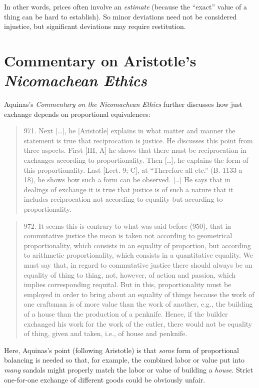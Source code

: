             In other words, prices often involve an \emph{estimate} (because the “exact” value of a thing can be hard to establish). So minor deviations need not be considered injustice, but significant deviations may require restitution.

\section{Commentary on Aristotle's \textit{Nicomachean Ethics}}

    Aquinas’s \textit{Commentary on the Nicomachean Ethics} further discusses how just exchange depends on proportional equivalences:
    
    \begin{quote}
        971. Next […], he [Aristotle] explains in what matter and manner the statement is true that reciprocation is justice. He discusses this point from three aspects. First [III, A] he shows that there must be reciprocation in exchanges according to proportionality. Then […], he explains the form of this proportionality. Last [Lect. 9; C], at “Therefore all etc.” (B. 1133 a 18), he shows how such a form can be observed. […] He says that in dealings of exchange it is true that justice is of such a nature that it includes reciprocation not according to equality but according to proportionality.
    \end{quote}
    
    \begin{quote}
        972. It seems this is contrary to what was said before (950), that in commutative justice the mean is taken not according to geometrical proportionality, which consists in an equality of proportion, but according to arithmetic proportionality, which consists in a quantitative equality. We must say that, in regard to commutative justice there should always be an equality of thing to thing, not, however, of action and passion, which implies corresponding requital. But in this, proportionality must be employed in order to bring about an equality of things because the work of one craftsman is of more value than the work of another, e.g., the building of a house than the production of a penknife. Hence, if the builder exchanged his work for the work of the cutler, there would not be equality of thing, given and taken, i.e., of house and penknife.
    \end{quote}

    Here, Aquinas’s point (following Aristotle) is that \emph{some} form of proportional balancing is needed so that, for example, the combined labor or value put into \emph{many} sandals might properly match the labor or value of building a \emph{house}. Strict one-for-one exchange of different goods could be obviously unfair.

